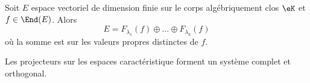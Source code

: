 \begin{theorem}     \label{ThoSpectraluRMLok}
    Soit \( E\) espace vectoriel de dimension finie sur le corps algébriquement clos \( \eK\) et \( f\in\End(E)\). Alors
    \begin{equation}    \label{EqCTFHooBSGhYK}
        E=F_{\lambda_1}(f)\oplus\ldots\oplus F_{\lambda_k}(f)
    \end{equation}
    où la somme est sur les valeurs propres distinctes de \( f\).

    Les projecteurs sur les espaces caractéristique forment un système complet et orthogonal.
\end{theorem}

